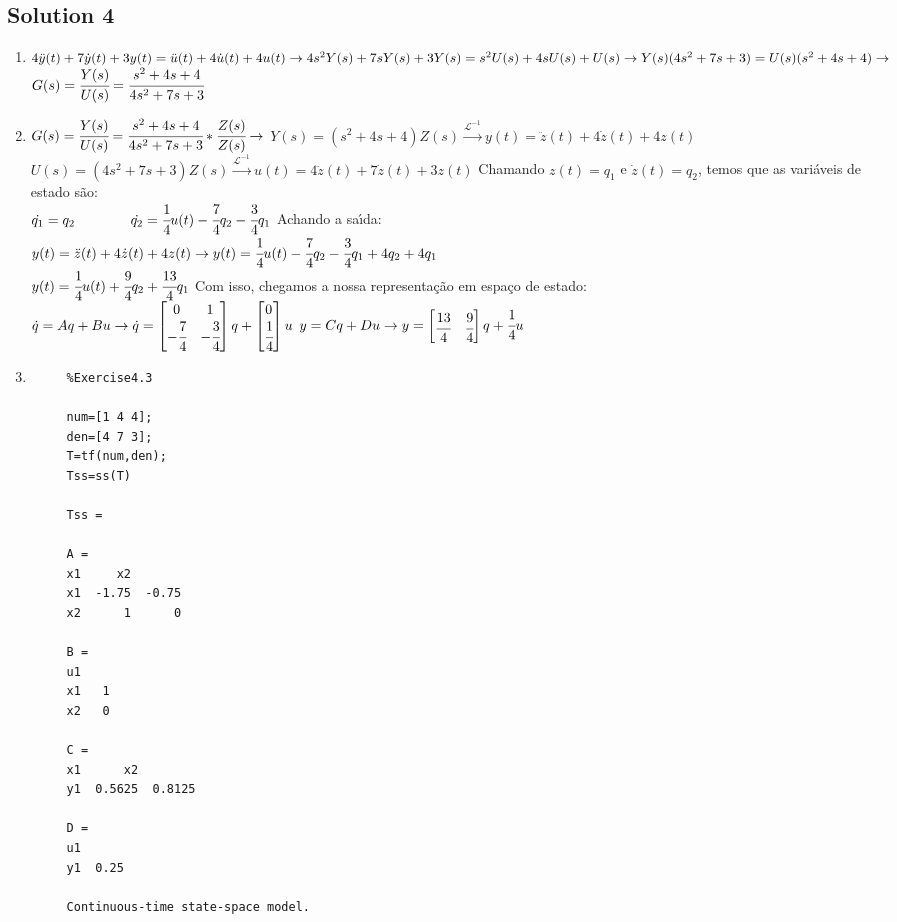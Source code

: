 \documentclass[a4paper,11pt]{article}
\begin{document}
\subsection*{Solution 4}
\begin{enumerate}
	\item $4\ddot{y}(t)+ 7\dot{y}(t)+3y(t)=\ddot{u}(t)+4\dot{u}(t)+4u(t)
	\rightarrow
	\\4s^2Y(s)+7sY(s)+3Y(s)=s^2U(s)+4sU(s)+U(s)
	\rightarrow
	\\Y(s)(4s^2+7s+3)=U(s)(s^2+4s+4)
	\rightarrow$
	\vskip0.4cm
	$G(s)=\cfrac{Y(s)}{U(s)}=\cfrac{s^2+4s+4}{4s^2+7s+3}$
	\item $G(s)=\cfrac{Y(s)}{U(s)}=\cfrac{s^2+4s+4}{4s^2+7s+3}*\cfrac{Z(s)}{Z(s)}\rightarrow$
	\vskip0.4cm
	$Y(s)=(s^2+4s+4)Z(s)
	\overset{\mathcal{L}^{-1}}{\longrightarrow}
	y(t)=\ddot{z}(t)+4\dot{z}(t)+4z(t) $
	\\$U(s)=(4s^2+7s+3)Z(s)
	\overset{\mathcal{L}^{-1}}{\longrightarrow}
	u(t)=4\ddot{z}(t)+7\dot{z}(t)+3z(t) $
	\vskip0.4cm
	Chamando $z(t)=q_1$ e $\dot{z}(t)=q_2$, temos que as vari\'{a}veis de estado s\~{a}o:
	\\$\dot{q_1}=q_2\qquad \qquad \dot{q_2}=\cfrac{1}{4}u(t)-\cfrac{7}{4}q_2-\cfrac{3}{4}q_1$
	\vskip0.4cm
	Achando a sa\'{\i}da:
	\\$y(t)=\ddot{z}(t)+4\dot{z}(t)+4z(t)\rightarrow
	 y(t)=\cfrac{1}{4}u(t)-\cfrac{7}{4}q_2-\cfrac{3}{4}q_1
	 +4q_2+4q_1$
	 \\$y(t)= \cfrac{1}{4}u(t)+\cfrac{9}{4}q_2+\cfrac{13}{4}q_1$
	 \vskip0.4cm
	 Com isso, chegamos a nossa representa\c{c}\~{a}o em espa\c{c}o de estado:\\
	 $\dot{q}=Aq+Bu\rightarrow\dot{q}=
	 \begin{bmatrix}
	 	0 & 1\\
	 	-\cfrac{7}{4} & -\cfrac{3}{4}
	 \end{bmatrix}q+
	 \begin{bmatrix}
	 0\\
	 \cfrac{1}{4}
	 \end{bmatrix}u$
	 \vskip0.4cm
	 $y=Cq+Du\rightarrow y=
	 \begin{bmatrix}
	 \cfrac{13}{4} & \cfrac{9}{4}
	 \end{bmatrix}q+\cfrac{1}{4}u$
	 \newpage
	 \item \begin{lstlisting}
	 %Exercise4.3
	 
	 num=[1 4 4];
	 den=[4 7 3];
	 T=tf(num,den);
	 Tss=ss(T)
	 
	 Tss =
	 
	 A = 
	 x1     x2
	 x1  -1.75  -0.75
	 x2      1      0
	 
	 B = 
	 u1
	 x1   1
	 x2   0
	 
	 C = 
	 x1      x2
	 y1  0.5625  0.8125
	 
	 D = 
	 u1
	 y1  0.25
	 
	 Continuous-time state-space model.
	 \end{lstlisting}
\end{enumerate}
\end{document}

